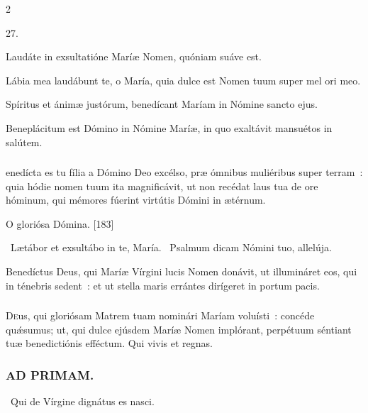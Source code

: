 \documentclass[9pt,twoside]{extarticle}
\begin{document}
\begin{multicols}{2}
{{\begin{tightlist}{}
\item {} 27.
\item {} Laudáte in exsultatióne Maríæ Nomen, quóniam suáve est.
\item {} Lábia mea laudábunt te, o María, quia dulce est Nomen tuum super mel ori meo.
\item {} Spíritus et ánimæ justórum, benedícant Maríam in Nómine sancto ejus.
\item {} Beneplácitum est Dómino in Nómine Maríæ, in quo exaltávit mansuétos in salútem.
\end{tightlist}

\subsubsection*{}
enedícta es tu fília a Dómino Deo excélso, præ ómnibus muliéribus super terram~: quia hódie nomen tuum ita magnificávit, ut non recédat laus tua de ore hóminum, qui mémores fúerint virtútis Dómini in ætérnum.

\begin{tightlist}{}
\item {} O gloriósa Dómina. [183]
\item {}~Lætábor et exsultábo in te, María. ~Psalmum dicam Nómini tuo, allelúja.
\item {} Benedíctus Deus, qui Maríæ Vírgini lucis Nomen donávit, ut illumináret eos, qui in ténebris sedent~: et ut stella maris errántes dirígeret in portum pacis.
\end{tightlist}

\subsubsection*{\center {}}
\lettrine{D}eus, qui gloriósam Matrem tuam nominári Maríam voluísti~: concéde quǽsumus; ut, qui dulce ejúsdem Maríæ Nomen implórant, perpétuum séntiant tuæ benedictiónis efféctum. Qui vivis et regnas.

\subsubsection*{\center \textsc{AD PRIMAM.}}
\begin{tightlist}{}
\item {}
\item {}~Qui de Vírgine dignátus es nasci.
\end{tightlist}

}}
\end{multicols}
\end{document}
